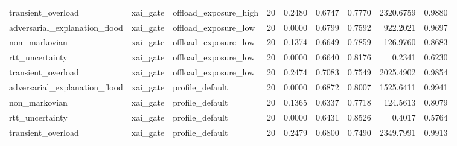 \begin{table}[t]
\begin{tabular}{lllrrrrrr}
transient\_overload & xai\_gate & offload\_exposure\_high & 20 & 0.2480 & 0.6747 & 0.7770 & 2320.6759 & 0.9880 \\
adversarial\_explanation\_flood & xai\_gate & offload\_exposure\_low & 20 & 0.0000 & 0.6799 & 0.7592 & 922.2021 & 0.9697 \\
non\_markovian & xai\_gate & offload\_exposure\_low & 20 & 0.1374 & 0.6649 & 0.7859 & 126.9760 & 0.8683 \\
rtt\_uncertainty & xai\_gate & offload\_exposure\_low & 20 & 0.0000 & 0.6640 & 0.8176 & 0.2341 & 0.6230 \\
transient\_overload & xai\_gate & offload\_exposure\_low & 20 & 0.2474 & 0.7083 & 0.7549 & 2025.4902 & 0.9854 \\
adversarial\_explanation\_flood & xai\_gate & profile\_default & 20 & 0.0000 & 0.6872 & 0.8007 & 1525.6411 & 0.9941 \\
non\_markovian & xai\_gate & profile\_default & 20 & 0.1365 & 0.6337 & 0.7718 & 124.5613 & 0.8079 \\
rtt\_uncertainty & xai\_gate & profile\_default & 20 & 0.0000 & 0.6431 & 0.8526 & 0.4017 & 0.5764 \\
transient\_overload & xai\_gate & profile\_default & 20 & 0.2479 & 0.6800 & 0.7490 & 2349.7991 & 0.9913 \\
\bottomrule
\end{tabular}
\end{table}

